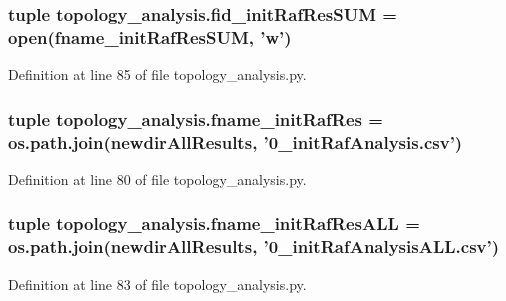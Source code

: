 \hypertarget{a00159_a89401fb2ff1eb8e1567b1625ad0bb84f}{
\subsubsection[{fid\+\_\+init\+Raf\+Res\+S\+U\+M}]{\setlength{\rightskip}{0pt plus 5cm}tuple topology\+\_\+analysis.\+fid\+\_\+init\+Raf\+Res\+S\+U\+M = open({\bf fname\+\_\+init\+Raf\+Res\+S\+U\+M}, 'w')}}\label{a00159_a89401fb2ff1eb8e1567b1625ad0bb84f}


Definition at line 85 of file topology\+\_\+analysis.\+py.

\hypertarget{a00159_a80488e9379ed7dc114c3ea6739d4fda9}{
\subsubsection[{fname\+\_\+init\+Raf\+Res}]{\setlength{\rightskip}{0pt plus 5cm}tuple topology\+\_\+analysis.\+fname\+\_\+init\+Raf\+Res = os.\+path.\+join({\bf newdir\+All\+Results}, '0\+\_\+init\+Raf\+Analysis.\+csv')}}\label{a00159_a80488e9379ed7dc114c3ea6739d4fda9}


Definition at line 80 of file topology\+\_\+analysis.\+py.

\hypertarget{a00159_a2ef3a802ca870bda339c2b50c046bc71}{
\subsubsection[{fname\+\_\+init\+Raf\+Res\+A\+L\+L}]{\setlength{\rightskip}{0pt plus 5cm}tuple topology\+\_\+analysis.\+fname\+\_\+init\+Raf\+Res\+A\+L\+L = os.\+path.\+join({\bf newdir\+All\+Results}, '0\+\_\+init\+Raf\+Analysis\+A\+L\+L.\+csv')}}\label{a00159_a2ef3a802ca870bda339c2b50c046bc71}


Definition at line 83 of file topology\+\_\+analysis.\+py.

